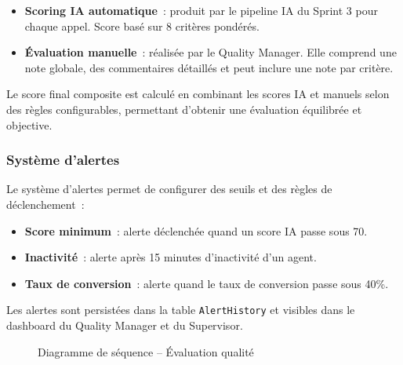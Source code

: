 \begin{itemize}
    \item \textbf{Scoring IA automatique}~: produit par le pipeline IA du Sprint 3 pour
    chaque appel. Score basé sur 8 critères pondérés.
    \item \textbf{Évaluation manuelle}~: réalisée par le Quality Manager. Elle comprend
    une note globale, des commentaires détaillés et peut inclure une note par critère.
\end{itemize}

Le score final composite est calculé en combinant les scores IA et manuels selon des règles
configurables, permettant d'obtenir une évaluation équilibrée et objective.

\subsubsection{Système d'alertes}

Le système d'alertes permet de configurer des seuils et des règles de déclenchement~:

\begin{itemize}
    \item \textbf{Score minimum}~: alerte déclenchée quand un score IA passe sous 70.
    \item \textbf{Inactivité}~: alerte après 15 minutes d'inactivité d'un agent.
    \item \textbf{Taux de conversion}~: alerte quand le taux de conversion passe sous 40\%.
\end{itemize}

Les alertes sont persistées dans la table \texttt{AlertHistory} et visibles dans le
dashboard du Quality Manager et du Supervisor.

\begin{figure}[H]
    \centering
    \caption{Diagramme de séquence -- Évaluation qualité}
    \label{fig:sprint4_quality_flow}
\end{figure}

